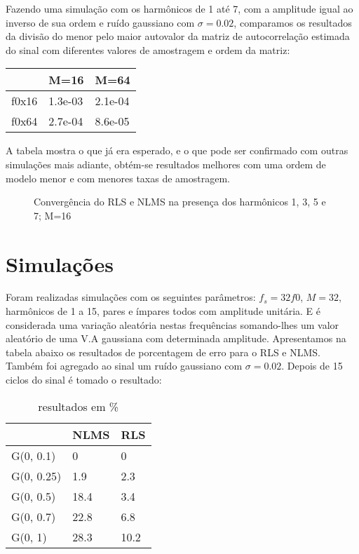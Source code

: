 Fazendo uma simulação com os harmônicos de 1 até 7, com a amplitude igual ao inverso de sua ordem e ruído gaussiano com $\sigma=0.02$, comparamos os resultados da divisão do menor pelo maior autovalor da matriz de autocorrelação estimada do sinal com diferentes valores de amostragem e ordem da matriz:

\begin{table}[H]
	\centering
	\begin{tabular}{l|l|l}
		   & M=16 & M=64 \\
		\hline 
		f0x16      & 1.3e-03 & 2.1e-04 \\
		f0x64      & 2.7e-04  & 8.6e-05       
	\end{tabular}
\end{table}

A tabela mostra o que já era esperado, e o que pode ser confirmado com outras simulações mais adiante, obtém-se resultados melhores com uma ordem de modelo menor e com menores taxas de amostragem.

\begin{figure}[h]
	\centering    
	\def\svgwidth{\columnwidth}
	
	\caption{Convergência do RLS e NLMS na presença dos harmônicos 1, 3, 5 e 7; M=16}
	\label{fig:your image label}
\end{figure}

\section{Simulações}

\indent Foram realizadas simulações com os seguintes parâmetros: $f_s=32f0$, $M=32$, harmônicos de 1 a 15, pares e ímpares todos com amplitude unitária. E é considerada uma variação aleatória nestas frequências somando-lhes um valor aleatório de uma V.A gaussiana com determinada amplitude. Apresentamos na tabela abaixo os resultados de porcentagem de erro para o RLS e NLMS. Também foi agregado ao sinal um ruído gaussiano com $\sigma=0.02$. Depois de 15 ciclos do sinal é tomado o resultado:

\begin{table}[H]
	\centering
	\begin{tabular}{l|l|l}
	              & NLMS & RLS \\
		\hline 
		G(0, 0.1)  & 0     & 0 \\
		G(0, 0.25) & 1.9   & 2.3  \\
		G(0, 0.5)  & 18.4  & 3.4  \\
		G(0, 0.7)  & 22.8  & 6.8  \\
		G(0, 1)    & 28.3  & 10.2 \\ 
	\end{tabular}
	\caption{resultados em \%}
\end{table}

